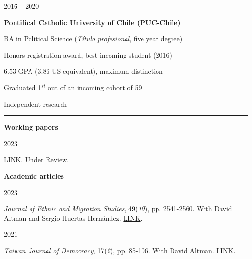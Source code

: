\documentclass[a4paper, 12pt]{article}
\begin{document}
\begin{multicols}{2}

2016 -- 2020
\columnbreak

\textbf{Pontifical Catholic University of Chile (PUC-Chile)}
\medskip

BA in Political Science (\textit{Título profesional}, five year degree)

Honors registration award, best incoming student (2016)

6.53 GPA (3.86 US equivalent), maximum distinction

Graduated 1$^{st}$ out of an incoming cohort of 59

\end{multicols}




\large Independent research
\smallskip
\hrule
\normalsize

\bigskip
\textbf{Working papers}

\begin{multicols}{2}

2023

\columnbreak

 \href{https://www.clementesanchez.com/manuscripts/eyes-beneath.pdf}{LINK}. Under Review.

\end{multicols}



\textbf{Academic articles}

\begin{multicols}{2}

2023

\columnbreak

 \textit{Journal of Ethnic and Migration Studies}, 49(\textit{10}), pp. 2541-2560. With David Altman and Sergio Huertas-Hernández. \href{https://www.tandfonline.com/doi/full/10.1080/1369183X.2023.2182713}{LINK}.

\end{multicols}


\begin{multicols}{2}

2021

\columnbreak

 \textit{Taiwan Journal of Democracy}, 17(\textit{2}), pp. 85-106. With David Altman. \href{https://www.tfd.org.tw/en/publication/journal}{LINK}.

\end{multicols}
\end{document}
